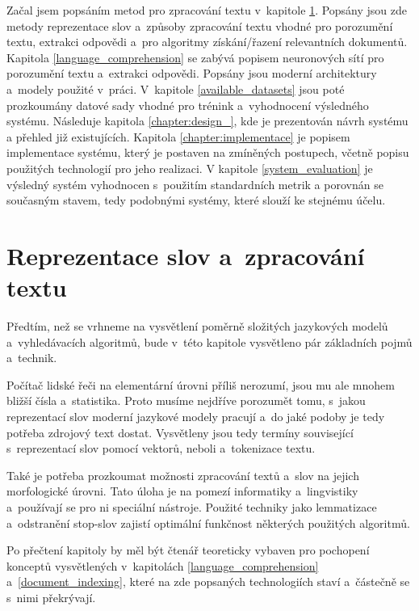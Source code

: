 Začal jsem popsáním metod pro zpracování textu v~kapitole \ref{text_processing}. Popsány jsou zde metody reprezentace slov a~způsoby zpracování textu vhodné pro porozumění textu, extrakci odpovědi a~pro algoritmy získání/řazení relevantních dokumentů. Kapitola \ref{language_comprehension} se zabývá popisem neuronových sítí pro porozumění textu a~extrakci odpovědi. Popsány jsou moderní architektury a~modely použité v~práci. V~kapitole \ref{available_datasets} jsou poté prozkoumány datové sady vhodné pro trénink a~vyhodnocení výsledného systému. Následuje kapitola \ref{chapter:design_}, kde je prezentován návrh systému a přehled již existujících. Kapitola \ref{chapter:implementace} je popisem implementace systému, který je postaven na zmíněných postupech, včetně popisu použitých technologií pro jeho realizaci. V kapitole \ref{system_evaluation} je výsledný systém vyhodnocen s~použitím standardních metrik a porovnán se současným stavem, tedy podobnými systémy, které slouží ke stejnému účelu.


\chapter{Reprezentace slov a~zpracování textu}
\label{text_processing}

Předtím, než se vrhneme na vysvětlení poměrně složitých jazykových modelů a~vyhledávacích algoritmů, bude v~této kapitole vysvětleno pár základních pojmů a~technik.\par 
Počítač lidské řeči na elementární úrovni příliš nerozumí, jsou mu ale mnohem bližší čísla a~statistika. Proto musíme nejdříve porozumět tomu, s~jakou reprezentací slov moderní jazykové modely pracují a~do jaké podoby je tedy potřeba zdrojový text dostat. Vysvětleny jsou tedy termíny související s~reprezentací slov pomocí vektorů, neboli  a~tokenizace textu.\par 
Také je potřeba prozkoumat možnosti zpracování textů a~slov na jejich morfologické úrovni. Tato úloha je na pomezí informatiky a~lingvistiky a~používají se pro ni speciální nástroje. Použité techniky jako lemmatizace a~odstranění stop-slov zajistí optimální funkčnost některých použitých algoritmů.\par
Po přečtení kapitoly by měl být čtenář teoreticky vybaven pro pochopení konceptů vysvětlených v~kapitolách \ref{language_comprehension} a~\ref{document_indexing}, které na zde popsaných technologiích staví a~částečně se s~nimi překrývají.

